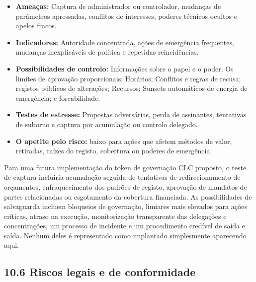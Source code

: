 \documentclass[11pt]{article}
\begin{document}
\begin{itemize}[leftmargin=*]
\item \textbf{Ameaças:} Captura de administrador ou controlador, mudanças de parâmetros apressadas, conflitos de interesses, poderes técnicos ocultos e apelos fracos.
\item \textbf{Indicadores:} Autoridade concentrada, ações de emergência frequentes, mudanças inexplicáveis de política e repetidas reincidências.
\item \textbf{Possibilidades de controlo:} Informações sobre o papel e o poder; Os limites de aprovação proporcionais; Horários; Conflitos e regras de recusa; registos públicos de alterações; Recursos; Sunsets automáticos de energia de emergência; e forcabilidade.
\item \textbf{Testes de estresse:} Propostas adversárias, perda de assinantes, tentativas de suborno e captura por acumulação ou controlo delegado.
\item \textbf{O apetite pelo risco:} baixo para ações que afetem métodos de valor, retiradas, raízes do registo, cobertura ou poderes de emergência.
\end{itemize}
Para uma futura implementação do token de governação CLC proposto, o teste de captura incluiria acumulação seguida de tentativas de redirecionamento de orçamentos, enfraquecimento dos padrões de registo, aprovação de mandatos de partes relacionadas ou esgotamento da cobertura financiada. As possibilidades de salvaguarda incluem bloqueios de governação, limiares mais elevados para ações críticas, atraso na execução, monitorização transparente das delegações e concentrações, um processo de incidente e um procedimento credível de saída e saída. Nenhum deles é representado como implantado simplesmente aparecendo aqui.

\subsection*{10.6 Riscos legais e de conformidade}
\end{document}
